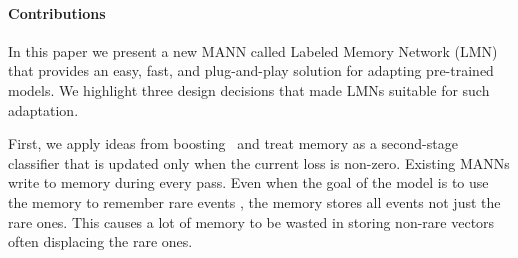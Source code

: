 \documentclass[letterpaper]{article} %
\def\shiv#1{\todo [color=orange]{Shiv: #1}}
\def\sunita#1{\todo [color=purple]{Sunita: #1}}
\begin{document}
\paragraph{Contributions}
In this paper we present a new MANN called Labeled Memory Network (LMN) that provides an easy, fast, and plug-and-play solution for adapting pre-trained models.  We highlight three design decisions that made LMNs suitable for such adaptation.

% 




First, we apply ideas from boosting~\cite{Schapire:1999adaboost} and treat memory as a second-stage classifier that is updated only when the current loss is non-zero. Existing MANNs write to memory during every pass.  Even when the goal of the model is to use the memory to remember rare events \cite{kaiser2017}, the memory stores all events not just the rare ones. This causes a lot of memory to be wasted in storing non-rare vectors often displacing the rare ones.
\end{document}
